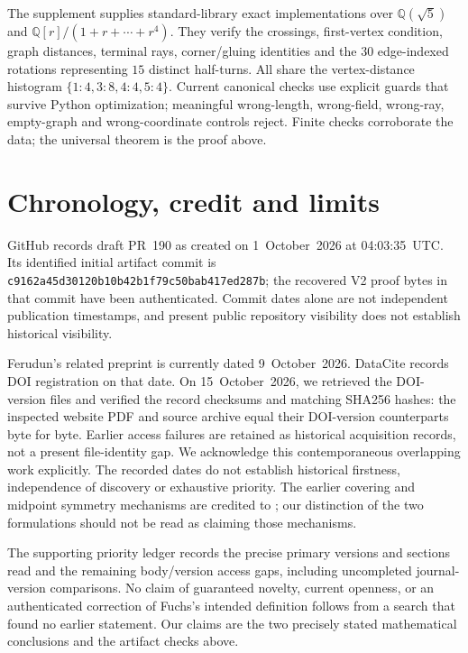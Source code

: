 \documentclass[11pt]{amsart}
\theoremstyle{remark}
\begin{document}
The supplement supplies standard-library exact implementations over $\mathbb Q(\sqrt5)$ and $\mathbb Q[r]/(1+r+\cdots+r^4)$. They verify the crossings, first-vertex condition, graph distances, terminal rays, corner/gluing identities and the $30$ edge-indexed rotations representing $15$ distinct half-turns. All share the vertex-distance histogram $\{1:4,3:8,4:4,5:4\}$. Current canonical checks use explicit guards that survive Python optimization; meaningful wrong-length, wrong-field, wrong-ray, empty-graph and wrong-coordinate controls reject. Finite checks corroborate the data; the universal theorem is the proof above.

\section{Chronology, credit and limits}
GitHub records draft PR~190 as created on 1~October~2026 at 04:03:35~UTC. Its identified initial artifact commit is
\texttt{c9162a45d30120b10b42b1f79c50bab417ed287b}; the recovered V2 proof bytes in that commit have been authenticated. Commit dates alone are not independent publication timestamps, and present public repository visibility does not establish historical visibility.

Ferudun's related preprint \cite{Ferudun} is currently dated 9~October~2026. DataCite records DOI registration on that date. On 15~October~2026, we retrieved the DOI-version files and verified the record checksums and matching SHA256 hashes: the inspected website PDF and source archive equal their DOI-version counterparts byte for byte. Earlier access failures are retained as historical acquisition records, not a present file-identity gap. We acknowledge this contemporaneous overlapping work explicitly. The recorded dates do not establish historical firstness, independence of discovery or exhaustive priority. The earlier covering and midpoint symmetry mechanisms are credited to \cite{AAH,Troubetzkoy}; our distinction of the two formulations should not be read as claiming those mechanisms.

The supporting priority ledger records the precise primary versions and sections read and the remaining body/version access gaps, including uncompleted journal-version comparisons. No claim of guaranteed novelty, current openness, or an authenticated correction of Fuchs's intended definition follows from a search that found no earlier statement. Our claims are the two precisely stated mathematical conclusions and the artifact checks above.
\end{document}

